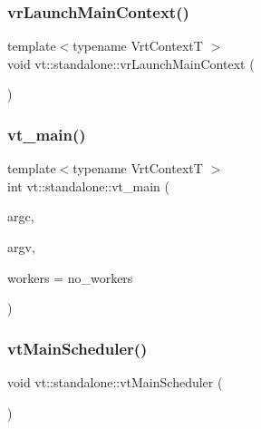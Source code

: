 \mbox{\label{namespacevt_1_1standalone_a670dc96651da265f465fbe0536555430}} 
\subsubsection{\texorpdfstring{vr\+Launch\+Main\+Context()}{vrLaunchMainContext()}}
{\footnotesize\ttfamily template$<$typename Vrt\+ContextT $>$ \\
void vt\+::standalone\+::vr\+Launch\+Main\+Context (\begin{DoxyParamCaption}{ }\end{DoxyParamCaption})\hspace{0.3cm}{\ttfamily [inline]}}

\mbox{\label{namespacevt_1_1standalone_a21572ffe25ef856833affb178fde4c66}} 
\subsubsection{\texorpdfstring{vt\+\_\+main()}{vt\_main()}}
{\footnotesize\ttfamily template$<$typename Vrt\+ContextT $>$ \\
int vt\+::standalone\+::vt\+\_\+main (\begin{DoxyParamCaption}\item[{int}]{argc,  }\item[{char $\ast$$\ast$}]{argv,  }\item[{\hyperlink{namespacevt_aa93398ea48f2cb6c188512250f7cc248}{Worker\+Count\+Type}}]{workers = {\ttfamily no\+\_\+workers} }\end{DoxyParamCaption})}

\mbox{\label{namespacevt_1_1standalone_a381ccc8b6c5dde4e852b5b012c525ba1}} 
\subsubsection{\texorpdfstring{vt\+Main\+Scheduler()}{vtMainScheduler()}}
{\footnotesize\ttfamily void vt\+::standalone\+::vt\+Main\+Scheduler (\begin{DoxyParamCaption}{ }\end{DoxyParamCaption})\hspace{0.3cm}{\ttfamily [inline]}}

